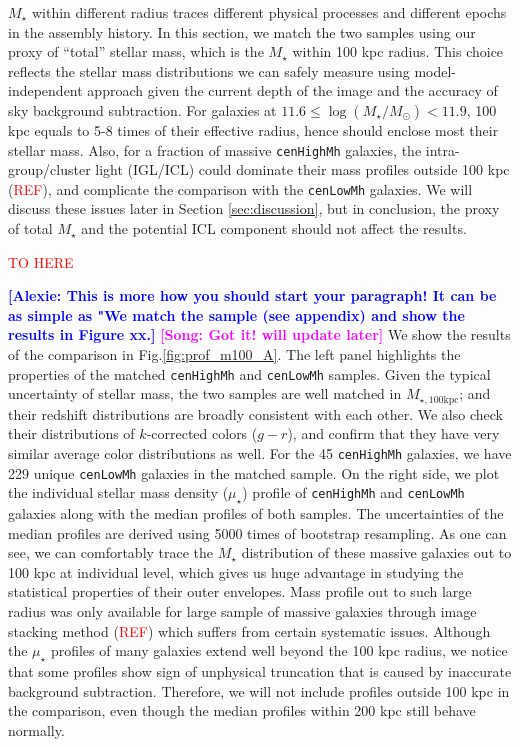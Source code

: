 \documentclass{emulateapj}
\def\rbcg{\texttt{cenHighMh}}
\def\nbcg{\texttt{cenLowMh}}
\def\mstar{{$M_{\star}$}}
\def\mtot{{$M_{\star,100\mathrm{kpc}}$}}
\def\mden{{$\mu_{\star}$}}
\newcommand{\addref}{{\textcolor{red}{REF}}}
\newcommand{\song}[1]{\textcolor{magenta}{\textbf{[Song: #1]}}}
\newcommand{\alexie}[1]{\textcolor{blue}{\textbf{[Alexie: #1]}}}
\begin{document}
\begin{CJK*}{UTF8}{gbsn}
    \mstar{} within different radius traces different physical processes and 
    different epochs in the assembly history.  
    In this section, we match the two samples using our proxy of ``total'' stellar 
    mass, which is the \mstar{} within 100 kpc radius.  
    This choice reflects the stellar mass distributions we can safely measure using 
    model-independent approach given the current depth of the image and the accuracy 
    of sky background subtraction.
    For galaxies at $11.6 \leq \log(M_{\star}/M_{\odot}) < 11.9$, 100 kpc equals to 
    5-8 times of their effective radius, hence should enclose most their stellar mass.
    Also, for a fraction of massive \rbcg{} galaxies, the intra-group/cluster light
    (IGL/ICL) could dominate their mass profiles outside 100 kpc (\addref), and 
    complicate the comparison with the \nbcg{} galaxies.  
    We will discuss these issues later in Section \ref{sec:discussion}, but in 
    conclusion, the proxy of total \mstar{} and the potential ICL component should 
    not affect the results. 
    
    \textcolor{red}{TO HERE}
    
    \alexie{This is more how you should start your paragraph! It can be as simple as "We match the sample (see appendix) and show the results in Figure xx.}
    \song{Got it! will update later}
    We show the results of the comparison in Fig.\ref{fig:prof_m100_A}. 
    The left panel highlights the properties of the matched \rbcg{} and \nbcg{} 
    samples.
    Given the typical uncertainty of stellar mass, the two samples are well 
    matched in \mtot{}; and their redshift distributions are broadly 
    consistent with each other.  
    We also check their distributions of $k$-corrected colors ($g-r$), and confirm 
    that they have very similar average color distributions as well.  
    For the 45 \rbcg{} galaxies, we have 229 unique \nbcg{} galaxies in the 
    matched sample.
    On the right side, we plot the individual stellar mass density (\mden{}) profile 
    of \rbcg{} and \nbcg{} galaxies along with the median profiles of both samples. 
    The uncertainties of the median profiles are derived using 5000 times of 
    bootstrap resampling.
    As one can see, we can comfortably trace the \mstar{} distribution of these massive 
    galaxies out to 100 kpc at individual level, which gives us huge advantage in 
    studying the statistical properties of their outer envelopes. 
    Mass profile out to such large radius was only available for large sample of 
    massive galaxies through image stacking method (\addref) which suffers from certain
    systematic issues. 
    Although the \mden{} profiles of many galaxies extend well beyond the 100 kpc radius, 
    we notice that some profiles show sign of unphysical truncation that is caused 
    by inaccurate background subtraction.  
    Therefore, we will not include profiles outside 100 kpc in the comparison, even 
    though the median profiles within 200 kpc still behave normally.  
        

\end{CJK*}
\end{document}
